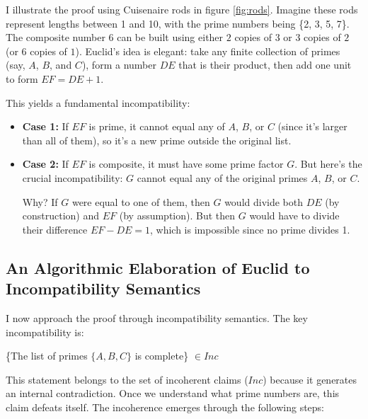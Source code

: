 \documentclass[12pt]{book}
\begin{document}
I illustrate the proof using Cuisenaire rods in figure \ref{fig:rods}. Imagine these rods represent lengths between 1 and 10, with the prime numbers being \{2, 3, 5, 7\}. The composite number 6 can be built using either $2$ copies of $3$ or $3$ copies of $2$ (or $6$ copies of $1$). Euclid's idea is elegant: take any finite collection of primes (say, $A$, $B$, and $C$), form a number $DE$ that is their product, then add one unit to form $EF = DE + 1$.







This yields a fundamental incompatibility:

\begin{itemize}
\item \textbf{Case 1:} If $EF$ is prime, it cannot equal any of $A$, $B$, or $C$ (since it's larger than all of them), so it's a new prime outside the original list.

\item \textbf{Case 2:} If $EF$ is composite, it must have some prime factor $G$. But here's the crucial incompatibility: $G$ cannot equal any of the original primes $A$, $B$, or $C$.

Why? If $G$ were equal to one of them, then $G$ would divide both $DE$ (by construction) and $EF$ (by assumption). But then $G$ would have to divide their difference $EF - DE = 1$, which is impossible since no prime divides 1.
\end{itemize}

\subsection{An Algorithmic Elaboration of Euclid to Incompatibility Semantics}

I now approach the proof through incompatibility semantics. The key incompatibility is:

\begin{center}
\{The list of primes $\{A, B, C\}$ is complete\} $\in Inc$
\end{center}

This statement belongs to the set of incoherent claims ($Inc$) because it generates an internal contradiction. Once we understand what prime numbers are, this claim defeats itself. The incoherence emerges through the following steps:
\end{document}
